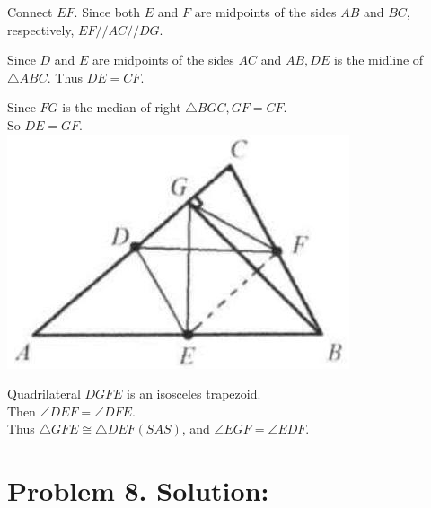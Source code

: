 \documentclass[10pt]{article}
\begin{document}
Connect \(E F\). Since both \(E\) and \(F\) are midpoints of the sides \(A B\) and \(B C\), respectively, \(E F / / A C / / D G\).

Since \(D\) and \(E\) are midpoints of the sides \(A C\) and \(A B, D E\) is the midline of \(\triangle A B C\). Thus \(D E=C F\).

Since \(F G\) is the median of right \(\triangle B G C, G F=C F\).\\
So \(D E=G F\).\\
\includegraphics[max width=\textwidth, center]{2025_04_17_97bc1f7e44d93c271a88g-050(2)}

Quadrilateral \(D G F E\) is an isosceles trapezoid.\\
Then \(\angle D E F=\angle D F E\).\\
Thus \(\triangle G F E \cong \triangle D E F(S A S)\), and \(\angle E G F=\angle E D F\).

\section*{Problem 8. Solution:}
\end{document}
